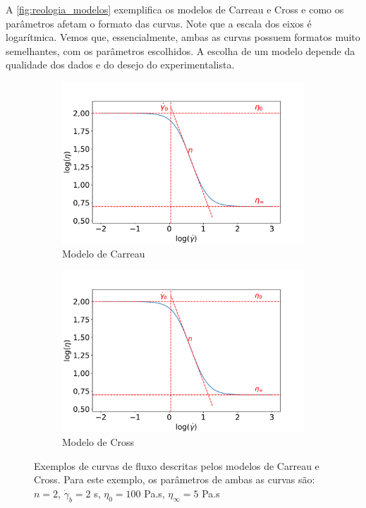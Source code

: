 			A \autoref{fig:reologia_modelos} exemplifica os modelos de Carreau e Cross e como os parâmetros afetam o formato das curvas. Note que a escala dos eixos é logarítmica. Vemos que, essencialmente, ambas as curvas possuem formatos muito semelhantes, com os parâmetros escolhidos. A escolha de um modelo depende da qualidade dos dados e do desejo do experimentalista.
			
			\begin{figure}[h]
				\begin{subfigure}[t]{0.5\textwidth}
					\centering
					\includegraphics[width=\textwidth]{./imagens/reologia/Carreau}
					\caption{Modelo de Carreau}
					\label{fig:reologia_modelo_carreau}
				\end{subfigure}%
				\begin{subfigure}[t]{0.5\textwidth}
					\centering
					\includegraphics[width=\textwidth]{./imagens/reologia/Cross}
					\caption{Modelo de Cross}
					\label{fig:reologia_modelo_cross}
				\end{subfigure}
				\caption{Exemplos de curvas de fluxo descritas pelos modelos de Carreau e Cross. Para este exemplo, os parâmetros de ambas as curvas são: \(n=2\), \(\dot{\gamma}_b=2\) s\menosUm, \(\eta_0=100\) Pa.s, \(\eta_{\infty}=5\) Pa.s}
				\label{fig:reologia_modelos}
			
			\end{figure}
			
